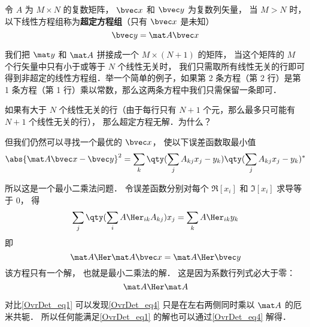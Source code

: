 

令 $A$ 为 $M\times N$ 的复数矩阵， $\bvec x$ 和 $\bvec y$ 为复数列矢量， 当 $M > N$ 时， 以下线性方程组称为\textbf{超定方程组}（只有 $\bvec x$ 是未知）
\begin{equation}\label{OvrDet_eq1}
\bvec y = \mat A \bvec x
\end{equation}

我们把 $\mat y$ 和 $\mat A$ 拼接成一个 $M\times(N+1)$ 的矩阵， 当这个矩阵的 $M$ 个行矢量中只有小于或等于 $N$ 个线性无关时， 我们只需取所有线性无关的行即可得到非超定的线性方程组．举一个简单的例子，如果第 2 条方程（第 2 行）是第 1 条方程（第 1 行）乘以常数，那么这两条方程中我们只需保留一条即可．

如果有大于 $N$ 个线性无关的行（由于每行只有 $N+1$ 个元，那么最多只可能有 $N+1$ 个线性无关的行）， 那么超定方程无解．为什么？


但我们仍然可以寻找一个最优的 $\bvec x$， 使以下误差函数取最小值
\begin{equation}
\abs{\mat A\bvec x - \bvec y}^2 =  \sum_k  \qty(\sum_j A_{kj} x_j - y_k) \qty(\sum_j A_{kj} x_j - y_k)^*
\end{equation}

所以这是一个最小二乘法问题． 令误差函数分别对每个 $\Re[x_i]$ 和 $\Im[x_i]$ 求导等于 0， 得
\begin{equation}
\sum_j \qty(\sum_i A\Her_{ik} A_{kj}) x_j = \sum_k A\Her_{ik} y_k
\end{equation}
即
\begin{equation}\label{OvrDet_eq4}
\mat A\Her \mat A \bvec x = \mat A\Her \bvec y
\end{equation}
该方程只有一个解， 也就是最小二乘法的解． 这是因为系数行列式必大于零：
\begin{equation}
\mat A\Her \mat A
\end{equation}


对比\autoref{OvrDet_eq1} 可以发现\autoref{OvrDet_eq4} 只是在左右两侧同时乘以 $\mat A$ 的厄米共轭． 所以任何能满足\autoref{OvrDet_eq1} 的解也可以通过\autoref{OvrDet_eq4} 解得．
